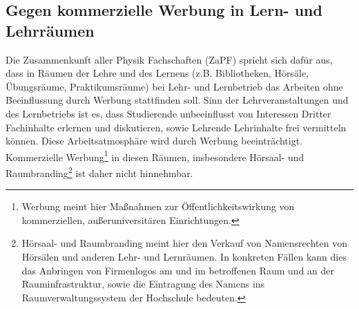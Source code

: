 
\subsection*{Gegen kommerzielle Werbung in Lern- und Lehrräumen}
Die Zusammenkunft aller Physik Fachschaften (ZaPF)  spricht sich dafür aus, dass in Räumen der Lehre und des Lernens (z.B. Bibliotheken, Hörsäle, Übungsräume, Praktikumsräume) bei Lehr- und Lernbetrieb das Arbeiten ohne Beeinflussung durch Werbung stattfinden soll. Sinn der Lehrveranstaltungen und des Lernbetriebs ist es, dass Studierende unbeeinflusst von Interessen Dritter Fachinhalte erlernen und diskutieren, sowie Lehrende Lehrinhalte frei vermitteln können. Diese Arbeitsatmosphäre wird durch Werbung beeinträchtigt.
Kommerzielle Werbung\footnote{Werbung meint hier Maßnahmen zur Öffentlichkeitswirkung von kommerziellen, außeruniversitären Einrichtungen.}  in diesen Räumen, insbesondere Hörsaal- und Raumbranding\footnote{Hörsaal- und Raumbranding meint hier den Verkauf von Namensrechten von Hörsälen und anderen Lehr- und Lernräumen. In konkreten Fällen kann dies das Anbringen von Firmenlogos am und im betroffenen Raum und an der Rauminfrastruktur, sowie die Eintragung des Namens ins Raumverwaltungssystem der Hochschule bedeuten.} ist daher nicht hinnehmbar.